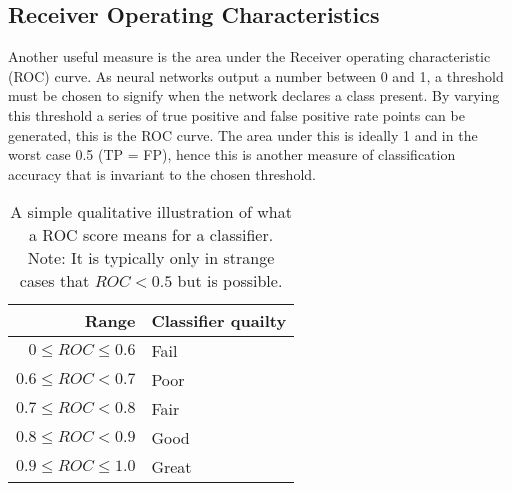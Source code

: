     \subsection{Receiver Operating Characteristics}
      Another useful measure is the area under the Receiver operating characteristic (ROC) curve.
      As neural networks output a number between 0 and 1, a threshold must be chosen to signify
      when the network declares a class present. By varying this threshold a series of true positive and false positive rate points
      can be generated, this is the ROC curve. The area under this is ideally 1 and in the worst case 0.5 (TP = FP), hence this is
      another measure of classification accuracy that is invariant to the chosen threshold.

      \begin{table}[]
        \centering \caption{A simple qualitative illustration of what a ROC score means for a classifier.
        Note: It is typically only in strange cases that $ROC< 0.5$ but is possible.} \label{my-label}
        \begin{tabular}{rl}
          \hline
          Range & Classifier quailty \\ \hline
          $0 \leq ROC \leq 0.6$   & Fail               \\
          $0.6 \leq ROC    < 0.7$   & Poor               \\
          $0.7 \leq ROC    < 0.8$   & Fair               \\
          $0.8 \leq ROC    < 0.9$   & Good               \\
          $0.9 \leq ROC \leq 1.0$   & Great              \\ \hline
        \end{tabular}
    \end{table}
